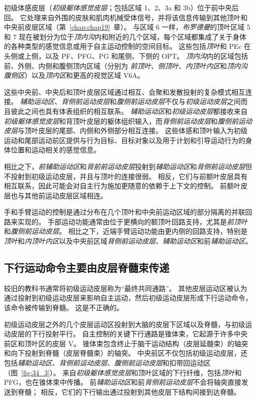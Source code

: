 初级体感皮层（\textit{初级躯体感觉皮层}；包括区域 1、2、3a 和 3b）位于前中央后回。
它处理来自外围的皮肤和肌肉机械受体信号，并将该信息传输到其他顶叶和中央前皮层区域（第~\ref{chap:chap19}~章）。
与区域 6 一样，\textit{布罗德曼}的顶叶区域 5 和 7 现在被划分为位于\textit{顶内沟}内和附近的几个区域，每个区域都集成了关于身体的各种类型的感觉信息或用于自主运动控制的空间目标。
这些包括\textit{顶叶}和 PEc 在头侧或上侧，以及 PF、PFG、PG 和尾侧、下侧的 OPT。
\textit{顶内沟}内的区域包括前、外侧、内侧和腹侧顶内区域（分别为 \textit{前顶叶}、\textit{侧顶叶}、\textit{内顶叶内区}和\textit{顶内沟腹侧区}）以及\textit{顶内区}和更高的视觉区域 V6A。


这些中央前、中央后和顶叶皮层区域通过相互、会聚和发散投射的复杂模式相互连接。
\textit{辅助运动区}、\textit{背侧前运动皮层}和\textit{腹侧前运动皮层}不仅与\textit{初级运动皮层}之间而且彼此之间也具有体表组织的相互联系。
\textit{辅助运动区}和\textit{初级运动皮层}都接收来自\textit{初级躯体感觉皮层}和背顶叶皮层的躯体组织输入，而\textit{背侧前运动皮层}和\textit{腹侧前运动皮层}与顶叶皮层的尾部、内侧和外侧部分相互连接。
这些体感和顶叶输入为初级运动和尾部运动前区提供与行为目标、目标对象以及用于计划和引导运动行为的身体位置和运动相关的感觉信息。


相比之下，\textit{前辅助运动区}和\textit{背前前运动皮层}投射到\textit{辅助运动区}和\textit{背侧前运动皮层}但不投射到初级运动皮层，并且与顶叶的连接很弱。
相反，它们与前额叶皮层具有相互联系，因此可能会对自主行为施加更随意的依赖于上下文的控制。
前额叶皮层也与其他前运动皮层区域相连。


手和手臂运动的控制是通过分布在几个顶叶和中央前运动区域的部分隔离的并联回路来实现的。
手部运动功能通常由位于更横向的额顶叶回路支持，尤其是\textit{前顶叶}和\textit{腹侧前运动皮层}。
相比之下，近端手臂运动功能由更内侧的回路支持，特别是\textit{顶叶}和\textit{内顶叶内区}以及中央前区域\textit{背侧前运动皮层}、\textit{辅助运动区}和前\textit{辅助运动区}。



\subsection{下行运动命令主要由皮层脊髓束传递}

较旧的教科书通常将初级运动皮层称为“最终共同通路”。
其他皮层运动区被认为通过投射到初级运动皮层来影响自主运动，然后初级运动皮层形成下行运动命令，该命令被传输到脊髓。
这是不正确的。


初级运动皮层之外的几个皮层运动区投射到大脑的皮层下区域以及脊髓，与初级运动皮层的下行投射平行。
自主控制的关键下行通路是锥体束，它起源于许多中央前区和顶叶区的皮层 V。
锥体束包含终止于脑干运动结构（皮层延髓束）的轴突和向下投射到脊髓（皮层脊髓束）的轴突。
中央前区不仅包括初级运动皮层，还包括\textit{辅助运动区}、\textit{背侧前运动皮层}、\textit{腹侧前运动皮层}和扣带回运动区（图~\ref{fig:34_3}）。
来自\textit{初级躯体感觉皮层}和顶叶区域的下行纤维，包括\textit{顶叶}和 PFG，也在锥体束中传播。
前\textit{辅助运动区}和前\textit{背侧前运动皮层}不会将轴突直接发送到脊髓；
相反，它们的下行输出通过投射到其他皮层下结构间接到达脊髓。


